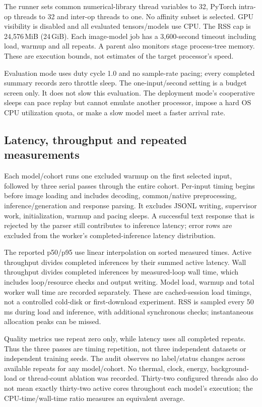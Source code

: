 \documentclass[11pt,a4paper]{article}
\begin{document}
The runner sets common numerical-library thread variables to 32, PyTorch intra-op threads to 32 and inter-op threads to one. No affinity subset is selected. GPU visibility is disabled and all evaluated tensors/models use CPU. The RSS cap is 24,576\,MiB (24\,GiB). Each image-model job has a 3,600-second timeout including load, warmup and all repeats. A parent also monitors stage process-tree memory. These are execution bounds, not estimates of the target processor's speed.

Evaluation mode uses duty cycle 1.0 and no sample-rate pacing; every completed summary records zero throttle sleep. The one-input/second setting is a budget screen only. It does not slow this evaluation. The deployment mode's cooperative sleeps can pace replay but cannot emulate another processor, impose a hard OS CPU utilization quota, or make a slow model meet a faster arrival rate.

\subsection{Latency, throughput and repeated measurements}
Each model/cohort runs one excluded warmup on the first selected input, followed by three serial passes through the entire cohort. Per-input timing begins before image loading and includes decoding, common/native preprocessing, inference/generation and response parsing. It excludes JSONL writing, supervisor work, initialization, warmup and pacing sleeps. A successful text response that is rejected by the parser still contributes to inference latency; error rows are excluded from the worker's completed-inference latency distribution.

The reported p50/p95 use linear interpolation on sorted measured times. Active throughput divides completed inferences by their summed active latency. Wall throughput divides completed inferences by measured-loop wall time, which includes loop/resource checks and output writing. Model load, warmup and total worker wall time are recorded separately. These are cached-session load timings, not a controlled cold-disk or first-download experiment. RSS is sampled every 50\,ms during load and inference, with additional synchronous checks; instantaneous allocation peaks can be missed.

Quality metrics use repeat zero only, while latency uses all completed repeats. Thus the three passes are timing repetition, not three independent datasets or independent training seeds. The audit observes no label/status changes across available repeats for any model/cohort. No thermal, clock, energy, background-load or thread-count ablation was recorded. Thirty-two configured threads also do not mean exactly thirty-two active cores throughout each model's execution; the CPU-time/wall-time ratio measures an equivalent average.
\end{document}
